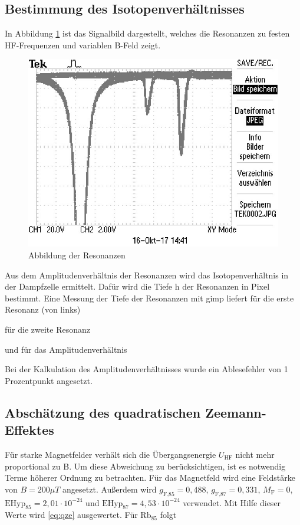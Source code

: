 \subsection{Bestimmung des Isotopenverhältnisses}
In Abbildung \ref{resonanz} ist das Signalbild dargestellt, welches die Resonanzen zu festen
HF-Frequenzen und variablen B-Feld zeigt.

\begin{figure}[h]
\centering
\includegraphics[width=\textwidth]{img/TEK0002.JPG}
\caption{Abbildung der Resonanzen}
\label{resonanz}
\end{figure}


Aus dem Amplitudenverhältnis der Resonanzen wird das Isotopenverhältnis in der
Dampfzelle ermittelt. Dafür wird die Tiefe h der Resonanzen in Pixel bestimmt.
Eine Messung der Tiefe der Resonanzen mit gimp liefert für die erste Resonanz (von links)



für die zweite Resonanz



und für das Amplitudenverhältnis



Bei der Kalkulation des Amplitudenverhältnisses wurde ein Ablesefehler von 1 Prozentpunkt
angesetzt.

\subsection{Abschätzung des quadratischen Zeemann-Effektes}
Für starke Magnetfelder verhält sich die Übergangsenergie $U_\text{HF}$ nicht mehr proportional zu B. Um diese Abweichung zu berücksichtigen, ist es notwendig Terme höherer Ordnung zu betrachten.
Für das Magnetfeld wird eine Feldstärke von $B = 200 \mu T$ angesetzt. Außerdem wird $g_\text{F,85} = 0,488$, $g_\text{F,87} = 0,331$, $M_\text{F} = 0$, 
$\text{EHyp}_{85} = 2,01 \cdot 10^{-24}$ und $\text{EHyp}_{87} = 4,53 \cdot 10^{-24}$ \cite{FP} verwendet. Mit Hilfe dieser Werte wird \ref{eq:qze} ausgewertet. Für $\text{Rb}_{85}$ folgt

